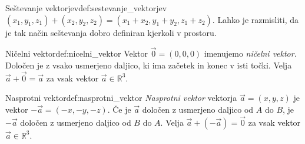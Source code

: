 \documentclass[a4,12pt]{article}
\newcommand{\R}{\mathbb{R}}
\begin{document}
    \begin{definition}{Seštevanje vektorjev}{def:sestevanje_vektorjev}
        \(\left(x_1, y_1, z_1\right) + \left(x_2, y_2, z_2\right) = \left(x_1 + x_2, y_1 + y_2, z_1 + z_2\right)\).
        Lahko je razmisliti, da je tak način seštevanja dobro definiran kjerkoli v prostoru.
        \begin{figure}[H]
            \centering
        \end{figure}
    \end{definition}
    \begin{definition}{Ničelni vektor}{def:nicelni_vektor}
        Vektor \(\vec{0} = \left(0, 0, 0\right)\) imenujemo \emph{ničelni vektor}. Določen je z vsako usmerjeno daljico,
        ki ima začetek in konec v isti točki. Velja \(\vec{a} + \vec{0} = \vec{a}\) za vsak vektor \(\vec{a} \in \R^3\).
    \end{definition}
    \begin{definition}{Nasprotni vektor}{def:nasprotni_vektor}
        \emph{Nasprotni vektor} vektorja \(\vec{a} = \left(x, y, z\right)\) je vektor \(-\vec{a} = \left(-x, -y, -z\right)\).
        Če je \(\vec{a}\) določen z usmerjeno daljico od \(A\) do \(B\), je \(-\vec{a}\) določen z usmerjeno daljico od \(B\) do \(A\).
        Velja \(\vec{a} + \left(-\vec{a}\right) = \vec{0}\) za vsak vektor \(\vec{a} \in \R^3\).
    \end{definition}
\end{document}
